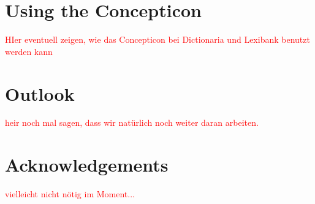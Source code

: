 \documentclass[10pt, a4paper]{article}
\begin{document}
\section{Using the Concepticon}
\textcolor{red}{HIer eventuell zeigen, wie das Concepticon bei Dictionaria und Lexibank benutzt
werden kann}

\section{Outlook}
\textcolor{red}{heir noch mal sagen, dass wir natürlich noch weiter daran arbeiten.}


\section{Acknowledgements}
\textcolor{red}{vielleicht nicht nötig im Moment...}

\free

\scriptsize

\end{document}
